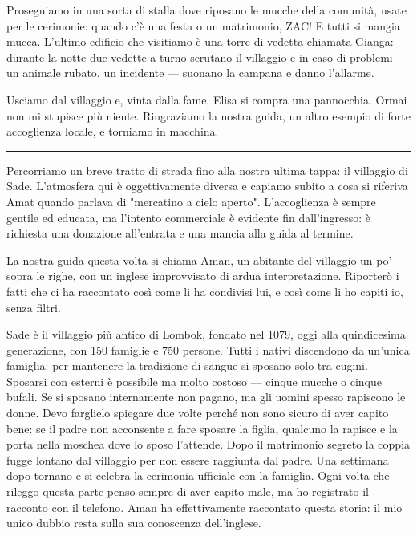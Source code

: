 Proseguiamo in una sorta di stalla dove riposano le mucche della comunità, usate per le cerimonie: quando c'è una festa o un matrimonio, ZAC! E tutti si mangia mucca. L'ultimo edificio che visitiamo è una torre di vedetta chiamata Gianga: durante la notte due vedette a turno scrutano il villaggio e in caso di problemi — un animale rubato, un incidente — suonano la campana e danno l'allarme.

Usciamo dal villaggio e, vinta dalla fame, Elisa si compra una pannocchia. Ormai non mi stupisce più niente. Ringraziamo la nostra guida, un altro esempio di forte accoglienza locale, e torniamo in macchina.

\begin{center}
    \noindent\rule{0.6\textwidth}{0.4pt}
\end{center}

Percorriamo un breve tratto di strada fino alla nostra ultima tappa: il villaggio di Sade. L'atmosfera qui è oggettivamente diversa e capiamo subito a cosa si riferiva Amat quando parlava di "mercatino a cielo aperto". L'accoglienza è sempre gentile ed educata, ma l'intento commerciale è evidente fin dall'ingresso: è richiesta una donazione all'entrata e una mancia alla guida al termine.

La nostra guida questa volta si chiama Aman, un abitante del villaggio un po' sopra le righe, con un inglese improvvisato di ardua interpretazione. Riporterò i fatti che ci ha raccontato così come li ha condivisi lui, e così come li ho capiti io, senza filtri.

Sade è il villaggio più antico di Lombok, fondato nel 1079, oggi alla quindicesima generazione, con 150 famiglie e 750 persone. Tutti i nativi discendono da un'unica famiglia: per mantenere la tradizione di sangue si sposano solo tra cugini. Sposarsi con esterni è possibile ma molto costoso — cinque mucche o cinque bufali. Se si sposano internamente non pagano, ma gli uomini spesso rapiscono le donne. Devo farglielo spiegare due volte perché non sono sicuro di aver capito bene: se il padre non acconsente a fare sposare la figlia, qualcuno la rapisce e la porta nella moschea dove lo sposo l'attende. Dopo il matrimonio segreto la coppia fugge lontano dal villaggio per non essere raggiunta dal padre. Una settimana dopo tornano e si celebra la cerimonia ufficiale con la famiglia. Ogni volta che rileggo questa parte penso sempre di aver capito male, ma ho registrato il racconto con il telefono. Aman ha effettivamente raccontato questa storia: il mio unico dubbio resta sulla sua conoscenza dell’inglese.

